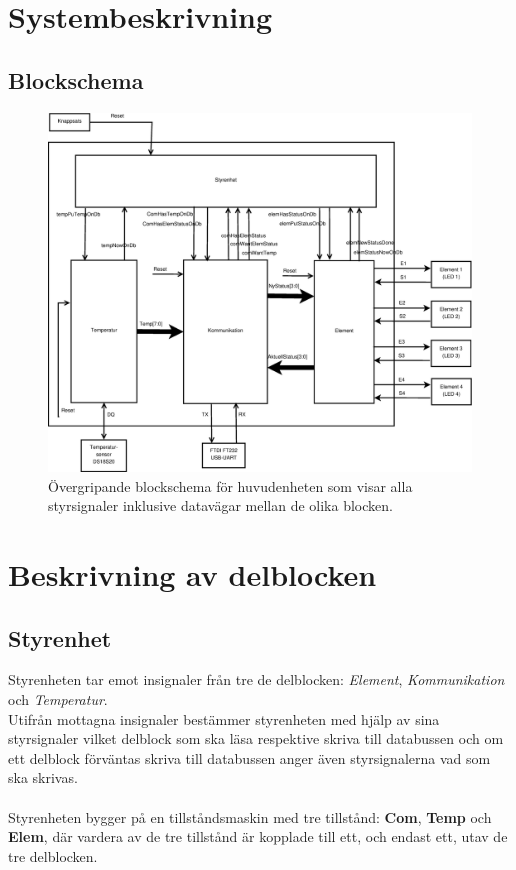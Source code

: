 \documentclass[a4paper]{scrartcl}
\begin{document}
\clearpage
\section{Systembeskrivning}

\subsection{Blockschema}
\begin{figure}[h!]
	\centering
	\advance\leftskip-3cm
	\advance\rightskip-3cm
	\includegraphics[width=15cm]{blockschema.eps}
	\caption{Övergripande blockschema för huvudenheten som visar alla styrsignaler inklusive datavägar mellan de olika blocken.}
\end{figure}


\clearpage
\section{Beskrivning av delblocken}

	\subsection{Styrenhet}
		Styrenheten tar emot insignaler från tre de delblocken: \emph{Element}, \emph{Kommunikation} och
		\emph{Temperatur}.
		\\
		Utifrån mottagna insignaler bestämmer styrenheten med hjälp av sina styrsignaler vilket delblock som ska läsa
		respektive skriva till databussen och om ett delblock förväntas skriva till databussen anger även styrsignalerna
		vad som ska skrivas. 
		\\\\
		Styrenheten bygger på en tillståndsmaskin med tre tillstånd: \textbf{Com}, \textbf{Temp} och \textbf{Elem}, där vardera
		av de tre tillstånd är kopplade till ett, och endast ett, utav de tre delblocken.
		
\end{document}

